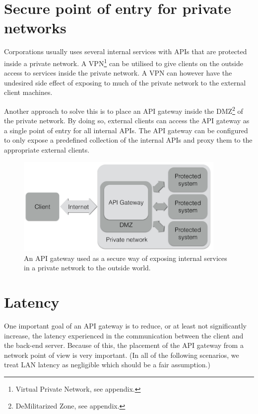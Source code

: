 \documentclass{cslthse-msc}
\begin{document}
\section{Secure point of entry for private networks}
Corporations usually uses several internal services with APIs that are protected inside a private network. A VPN\footnote{Virtual Private Network, see appendix.} can be utilised to give clients on the outside access to services inside the private network. A VPN can however have the undesired side effect of exposing to much of the private network to the external client machines.

Another approach to solve this is to place an API gateway inside the DMZ\footnote{DeMilitarized Zone, see appendix.} of the private network. By doing so, external clients can access the API gateway as a single point of entry for all internal APIs. The API gateway can be configured to only expose a predefined collection of the internal APIs and proxy them to the appropriate external clients.

\begin{figure}[H]
  \centering
    \begin{center}
      \includegraphics[width=0.9\textwidth]{images/api_gateway_dmz.png}
    \end{center}
  \caption{An API gateway used as a secure way of exposing internal services in a private network to the outside world.}
\end{figure}

\section{Latency}
One important goal of an API gateway is to reduce, or at least not significantly increase, the latency experienced in the communication between the client and the back-end server. Because of this, the placement of the API gateway from a network point of view is very important. (In all of the following scenarios, we treat LAN latency as negligible which should be a fair assumption.)
\end{document}
